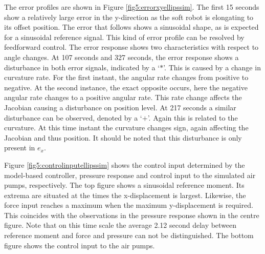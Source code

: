 The error profiles are shown in Figure \ref{fig5:errorxyellipssim}. The first 15 seconds show a relatively large error in the y-direction as the soft robot is elongating to its offset position. The error that follows shows a sinusoidal shape, as is expected for a sinusoidal reference signal. This kind of error profile can be resolved by feedforward control. The error response shows two characteristics with respect to angle changes. At 107 seconds and 327 seconds, the error response shows a disturbance in both error signals, indicated by a `$*$'. This is caused by a change in curvature rate. For the first instant, the angular rate changes from positive to negative. At the second instance, the exact opposite occurs, here the negative angular rate changes to a positive angular rate. This rate change affects the Jacobian causing a disturbance on position level. At 217 seconds a similar disturbance can be observed, denoted by a `$+$'. Again this is related to the curvature. At this time instant the curvature changes sign, again affecting the Jacobian and thus position. It should be noted that this disturbance is only present in $e_x$.




Figure \ref{fig5:controlinputellipssim} shows the control input determined by the model-based controller, pressure response and control input to the simulated air pumps, respectively. The top figure shows a sinusoidal reference moment. Its extrema are situated at the times the x-displacement is largest. Likewise, the force input reaches a maximum when the maximum y-displacement is required. This coincides with the observations in the pressure response shown in the centre figure. Note that on this time scale the average 2.12 second delay between reference moment and force and pressure can not be distinguished. The bottom figure shows the control input to the air pumps.



